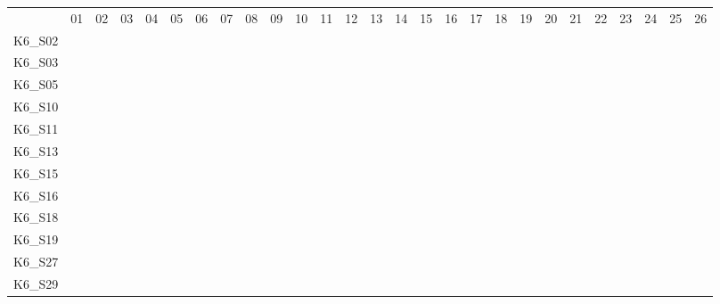 \begin{table}[htpb]
    \setlength{\tabcolsep}{0.2em}
    \tiny
    \centering
    \begin{tabular}{l|rrrrrrrrrrrrrrrrrrrrrrrrrr}
        \toprule
        \midrule
                & 01 & 02 & 03 & 04 & 05 & 06 & 07 & 08 & 09 & 10 & 11 & 12 & 13 & 14 & 15 & 16 & 17 & 18 & 19 & 20 & 21 & 22 & 23 & 24 & 25 & 26 \\
        K6\_S02 & \n & \n & \n & \n & \n & \n & \n & \n & \n & \n & \n & \n & \e & \n & \n & \n & \n & \n & \n & \n & \n & \e & \e & \n & \n & \n \\
        K6\_S03 & \n & \n & \n & \n & \n & \n & \n & \n & \n & \n & \n & \n & \e & \n & \n & \n & \n & \n & \n & \n & \n & \n & \e & \n & \n & \n \\
        K6\_S05 & \n & \n & \n & \n & \n & \n & \n & \n & \n & \n & \n & \n & \n & \n & \n & \n & \n & \n & \n & \e & \e & \n & \e & \n & \n & \n \\
        K6\_S10 & \n & \n & \n & \n & \n & \n & \n & \n & \n & \n & \n & \n & \n & \n & \n & \n & \n & \n & \n & \n & \n & \n & \n & \n & \n & \e \\
        K6\_S11 & \n & \n & \n & \n & \n & \n & \n & \e & \n & \n & \n & \n & \n & \n & \n & \n & \n & \n & \n & \n & \n & \n & \n & \n & \n & \n \\
        K6\_S13 & \n & \n & \n & \n & \n & \n & \n & \n & \n & \n & \n & \n & \n & \n & \n & \n & \n & \n & \n & \n & \n & \n & \n & \n & \n & \n \\
        K6\_S15 & \n & \n & \n & \n & \n & \n & \n & \n & \n & \n & \n & \n & \n & \n & \n & \n & \n & \n & \n & \n & \n & \n & \n & \n & \n & \n \\
        K6\_S16 & \n & \n & \n & \n & \n & \n & \n & \n & \n & \n & \n & \n & \n & \n & \n & \n & \n & \n & \n & \n & \n & \n & \n & \n & \n & \n \\
        K6\_S18 & \n & \n & \n & \n & \n & \n & \n & \n & \n & \n & \n & \n & \n & \n & \n & \n & \n & \n & \n & \n & \n & \n & \n & \n & \n & \n \\
        K6\_S19 & \n & \n & \n & \n & \n & \n & \n & \n & \n & \n & \n & \n & \n & \n & \n & \n & \n & \n & \n & \n & \n & \n & \n & \n & \n & \n \\
        K6\_S27 & \n & \n & \n & \n & \n & \n & \n & \n & \n & \n & \n & \n & \n & \n & \n & \n & \n & \n & \n & \n & \n & \n & \n & \n & \n & \n \\
        K6\_S29 & \n & \n & \n & \n & \n & \n & \n & \n & \n & \n & \n & \n & \n & \n & \n & \n & \n & \n & \n & \n & \n & \n & \n & \n & \n & \n \\

\end{tabular}
\end{table}
